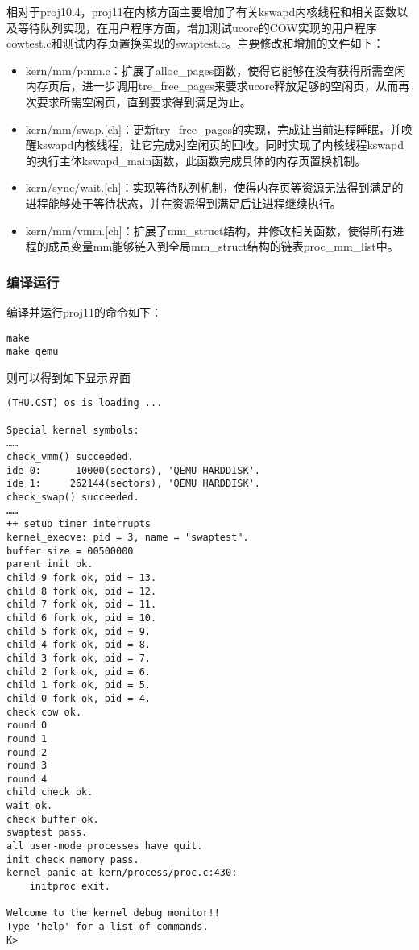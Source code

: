 相对于proj10.4，proj11在内核方面主要增加了有关kswapd内核线程和相关函数以及等待队列实现，在用户程序方面，增加测试ucore的COW实现的用户程序cowtest.c和测试内存页置换实现的swaptest.c。主要修改和增加的文件如下：

\begin{itemize}
\item
  kern/mm/pmm.c：扩展了alloc\_pages函数，使得它能够在没有获得所需空闲内存页后，进一步调用tre\_free\_pages来要求ucore释放足够的空闲页，从而再次要求所需空闲页，直到要求得到满足为止。
\item
  kern/mm/swap.{[}ch{]}：更新try\_free\_pages的实现，完成让当前进程睡眠，并唤醒kswapd内核线程，让它完成对空闲页的回收。同时实现了内核线程kswapd的执行主体kswapd\_main函数，此函数完成具体的内存页置换机制。
\item
  kern/sync/wait.{[}ch{]}：实现等待队列机制，使得内存页等资源无法得到满足的进程能够处于等待状态，并在资源得到满足后让进程继续执行。
\item
  kern/mm/vmm.{[}ch{]}：扩展了mm\_struct结构，并修改相关函数，使得所有进程的成员变量mm能够链入到全局mm\_struct结构的链表proc\_mm\_list中。
\end{itemize}

\subsubsection{编译运行}\label{ux7f16ux8bd1ux8fd0ux884c}

编译并运行proj11的命令如下：

\begin{lstlisting}
make
make qemu
\end{lstlisting}

则可以得到如下显示界面

\begin{lstlisting}
(THU.CST) os is loading ...

Special kernel symbols:
……
check_vmm() succeeded.
ide 0:      10000(sectors), 'QEMU HARDDISK'.
ide 1:     262144(sectors), 'QEMU HARDDISK'.
check_swap() succeeded.
……
++ setup timer interrupts
kernel_execve: pid = 3, name = "swaptest".
buffer size = 00500000
parent init ok.
child 9 fork ok, pid = 13.
child 8 fork ok, pid = 12.
child 7 fork ok, pid = 11.
child 6 fork ok, pid = 10.
child 5 fork ok, pid = 9.
child 4 fork ok, pid = 8.
child 3 fork ok, pid = 7.
child 2 fork ok, pid = 6.
child 1 fork ok, pid = 5.
child 0 fork ok, pid = 4.
check cow ok.
round 0
round 1
round 2
round 3
round 4
child check ok.
wait ok.
check buffer ok.
swaptest pass.
all user-mode processes have quit.
init check memory pass.
kernel panic at kern/process/proc.c:430:
    initproc exit.

Welcome to the kernel debug monitor!!
Type 'help' for a list of commands.
K>
\end{lstlisting}

